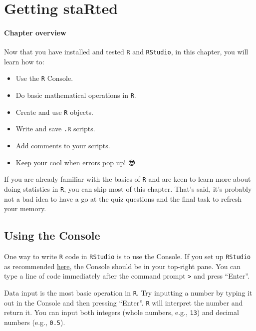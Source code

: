\documentclass[
  letterpaper,
  DIV=11,
  numbers=noendperiod]{scrreprt}
\providecommand{\tightlist}{%
  \setlength{\itemsep}{0pt}\setlength{\parskip}{0pt}}\usepackage{longtable,booktabs,array}
\begin{document}

\chapter{Getting staRted}\label{getting-started}

\subsubsection*{\texorpdfstring{\textbf{Chapter
overview}}{Chapter overview}}\label{chapter-overview-1}

Now that you have installed and tested \texttt{R} and \texttt{RStudio},
in this chapter, you will learn how to:

\begin{itemize}
\tightlist
\item
  Use the \texttt{R} Console.
\item
  Do basic mathematical operations in \texttt{R}.
\item
  Create and use \texttt{R} objects.
\item
  Write and save \texttt{.R} scripts.
\item
  Add comments to your scripts.
\item
  Keep your cool when errors pop up! 😎
\end{itemize}

If you are already familiar with the basics of \texttt{R} and are keen
to learn more about doing statistics in \texttt{R}, you can skip most of
this chapter. That's said, it's probably not a bad idea to have a go at
the quiz questions and the final task to refresh your memory.

\section{Using the Console}\label{using-the-console}

One way to write \texttt{R} code in \texttt{RStudio} is to use the
Console. If you set up \texttt{RStudio} as recommended
\href{https://elenlefoll.github.io/RstatsTextbook/InstallingR.html\#global-options}{here},
the Console should be in your top-right pane. You can type a line of
code immediately after the command prompt \texttt{\textgreater{}} and
press ``Enter''.

Data input is the most basic operation in \texttt{R}. Try inputting a
number by typing it out in the Console and then pressing ``Enter''.
\texttt{R} will interpret the number and return it. You can input both
integers (whole numbers, e.g., \texttt{13}) and decimal numbers (e.g.,
\texttt{0.5}).
\end{document}
